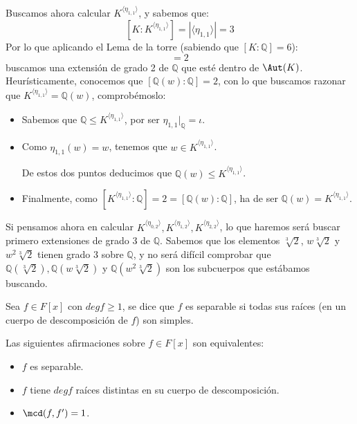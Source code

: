 \begin{ejemplo}
    \noindent
    Buscamos ahora calcular $K^{\langle \eta_{1,1} \rangle }$, y sabemos que:
    \begin{equation*}
        \left[K:K^{\langle \eta_{1,1} \rangle }\right] = |\langle \eta_{1,1} \rangle | = 3
    \end{equation*}
    Por lo que aplicando el Lema de la torre (sabiendo que $[K:\mathbb{Q}] = 6$):
    \begin{equation*}
        [K^{\langle \eta_{1,1} \rangle }:\mathbb{Q}] = 2
    \end{equation*}
    buscamos una extensión de grado 2 de $\mathbb{Q}$ que esté dentro de $\Aut(K)$. Heurísticamente, conocemos que $[\mathbb{Q}(w):\mathbb{Q}] = 2$, con lo que buscamos razonar que $K^{\langle \eta_{1,1} \rangle } = \mathbb{Q}(w)$, comprobémoslo:
    \begin{itemize}
        \item Sabemos que $\mathbb{Q}\leq K^{\langle \eta_{1,1} \rangle }$, por ser $\eta_{1,1}\big|_{\mathbb{Q}} = \iota$.
        \item Como $\eta_{1,1}(w) = w$, tenemos que $w\in K^{\langle \eta_{1,1} \rangle }$.

            De estos dos puntos deducimos que $\mathbb{Q}(w)\leq K^{\langle \eta_{1,1} \rangle }$.
        \item Finalmente, como $[K^{\langle \eta_{1,1} \rangle }:\mathbb{Q}] = 2 = [\mathbb{Q}(w):\mathbb{Q}]$, ha de ser $\mathbb{Q}(w) = K^{\langle \eta_{1,1} \rangle }$.
    \end{itemize}

    \noindent
    Si pensamos ahora en calcular $K^{\langle \eta_{0,2} \rangle }, K^{\langle \eta_{1,2} \rangle }, K^{\langle \eta_{2,2} \rangle }$, lo que haremos será buscar primero extensiones de grado 3 de $\mathbb{Q}$. Sabemos que los elementos $\sqrt[3]{2}$, $w\sqrt[3]{2}$ y $w^2\sqrt[3]{2}$ tienen grado 3 sobre $\mathbb{Q}$, y no será difícil comprobar que $\mathbb{Q}(\sqrt[3]{2}), \mathbb{Q}(w\sqrt[3]{2})$ y $\mathbb{Q}(w^2\sqrt[3]{2})$ son los subcuerpos que estábamos buscando.
\end{ejemplo}

\begin{definicion}
    Sea $f\in F[x]$ con $degf \geq 1$, se dice que $f$ es separable si todas sus raíces (en un cuerpo de descomposición de $f$) son simples.
\end{definicion}

\begin{observacion}
    Las siguientes afirmaciones sobre $f\in F[x]$ son equivalentes:
    \begin{itemize}
        \item $f$ es separable.
        \item $f$ tiene $degf$ raíces distintas en su cuerpo de descomposición.
        \item $\mcd (f,f') = 1$.
    \end{itemize}
\end{observacion}

